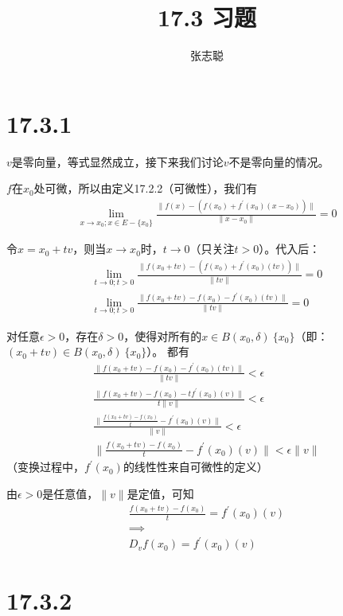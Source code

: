 \documentclass{article}
\begin{document}
\title{17.3 习题}
\author{张志聪}
\maketitle

\section*{17.3.1}

$v$是零向量，等式显然成立，接下来我们讨论$v$不是零向量的情况。

$f$在$x_0$处可微，所以由定义17.2.2（可微性），我们有
\begin{align*}
  \lim\limits_{x \to x_0; x \in E - \{x_0\}} \frac{\|f(x) - (f(x_0) + f^\prime(x_0)(x- x_0)) \|}{\|x-x_0\|} = 0
\end{align*}

令$x = x_0 + tv$，则当$x \to x_0$时，$t \to 0$（只关注$t > 0$）。代入后：
\begin{align*}
  \lim\limits_{t \to 0; t > 0} \frac{\|f(x_0 + tv) - (f(x_0) + f^\prime(x_0)(tv)) \|}{\|tv\|} = 0 \\
  \lim\limits_{t \to 0; t > 0} \frac{\|f(x_0 + tv) - f(x_0) - f^\prime(x_0)(tv)\|}{\|tv\|} = 0
\end{align*}

对任意$\epsilon > 0$，存在$\delta > 0$，使得对所有的$x \in B(x_0, \delta) \ \{x_0\}$（即：$(x_0 + tv) \in B(x_0, \delta) \ \{x_0\}$）。
都有
\begin{align*}
  \frac{\|f(x_0 + tv) - f(x_0) - f^\prime(x_0)(tv)\|}{\|tv\|} < \epsilon         \\
  \frac{\|f(x_0 + tv) - f(x_0) - tf^\prime(x_0)(v)\|}{t\|v\|} < \epsilon         \\
  \frac{\|\frac{f(x_0 + tv) - f(x_0)}{t} - f^\prime(x_0)(v)\|}{\|v\|} < \epsilon \\
  \|\frac{f(x_0 + tv) - f(x_0)}{t} - f^\prime(x_0)(v)\| < \epsilon \|v\|
\end{align*}
（变换过程中，$f^\prime(x_0)$的线性性来自可微性的定义）

由$\epsilon > 0$是任意值，$\|v\|$是定值，可知
\begin{align*}
  \frac{f(x_0 + tv) - f(x_0)}{t} = f^\prime(x_0)(v) \\
  \implies                                          \\
  D_vf(x_0) = f^\prime(x_0)(v)
\end{align*}

\section*{17.3.2}
\end{document}
